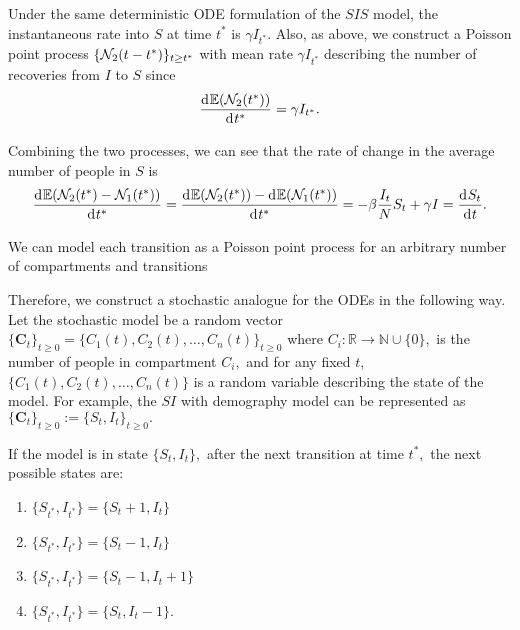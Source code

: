Under the same deterministic ODE formulation of the $SIS$ model,
the instantaneous
rate into $S$ at time $t^*$ is $\gamma I_{t^*}.$ Also, as above, we
construct a Poisson point process $\{\mathcal{N}_2(t - t^*)\}_{t\geq t^*}$ with
mean rate $\gamma I_{t^*}$ describing the number of recoveries from
$I$ to $S$
since
$$\frac{\diff \E(\N_2(t^*))}{\diff t^*} = \gamma I_{t^*}.
$$

Combining the two processes, we can see that the rate of change in the
average number of people in $S$ is
$$
    \frac{\diff \E(\N_2(t^*) - \N_1(t^*))}{\diff t^*}
    = \frac{\diff \E(\N_2(t^*)) - \diff \E(\N_1(t^*))}{\diff t^*}
    = -\beta \frac{I_t}{N}S_t + \gamma I
    = \frac{\diff S_t}{\diff t}.
$$

We can model each
transition as a Poisson point process for an 
arbitrary number of compartments and transitions

Therefore, we construct a stochastic analogue for the ODEs in the following way.
Let the stochastic model be a
random vector
$\{\mathbf{C}_t\}_{t\geq 0} = \{C_1(t), C_2(t), \dots, C_n(t)\}_{t\geq 0}$
where $C_i:\mathbb{R} \to \mathbb{N}\cup\{0\},$ is the number of people in
compartment $C_i,$ and for any fixed $t$, $\{C_1(t), C_2(t), \dots, C_n(t)\}$
is a random variable describing the state of the model. For example, the $SI$
with demography model can be represented as
$\{\mathbf{C}_t\}_{t\geq 0}:=\{S_t, I_t\}_{t\geq 0}.$

If the model is in state $\{S_t, I_t\},$ after the next transition
at time $t^*,$ the next possible states are:
\begin{enumerate}
    \item $\{S_{t^*}, I_{t^*}\}=\{S_t + 1, I_t\}$ %
    \item $\{S_{t^*}, I_{t^*}\}=\{S_t - 1, I_t\}$ %
    \item $\{S_{t^*}, I_{t^*}\}=\{S_t - 1, I_t + 1\}$ %
    \item $\{S_{t^*}, I_{t^*}\}=\{S_t, I_t - 1\}.$ %
\end{enumerate}

